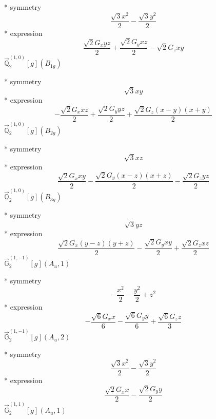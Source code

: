 \documentclass[fleqn,8pt]{jsarticle}
\begin{document}
\noindent\quad ** symmetry
\begin{dmath*}
\frac{\sqrt{3} x^{2}}{2} - \frac{\sqrt{3} y^{2}}{2}
\end{dmath*}
\noindent\quad ** expression
\begin{dmath*}
\frac{\sqrt{2} G_{x} y z}{2} + \frac{\sqrt{2} G_{y} x z}{2} - \sqrt{2} G_{z} x y
\end{dmath*}
\noindent\quad $\vec{\mathbb{Q}}_{2}^{(1,0)}[g](B_{1g})$

\noindent\quad ** symmetry
\begin{dmath*}
\sqrt{3} x y
\end{dmath*}
\noindent\quad ** expression
\begin{dmath*}
- \frac{\sqrt{2} G_{x} x z}{2} + \frac{\sqrt{2} G_{y} y z}{2} + \frac{\sqrt{2} G_{z} \left(x - y\right) \left(x + y\right)}{2}
\end{dmath*}
\noindent\quad $\vec{\mathbb{Q}}_{2}^{(1,0)}[g](B_{2g})$

\noindent\quad ** symmetry
\begin{dmath*}
\sqrt{3} x z
\end{dmath*}
\noindent\quad ** expression
\begin{dmath*}
\frac{\sqrt{2} G_{x} x y}{2} - \frac{\sqrt{2} G_{y} \left(x - z\right) \left(x + z\right)}{2} - \frac{\sqrt{2} G_{z} y z}{2}
\end{dmath*}
\noindent\quad $\vec{\mathbb{Q}}_{2}^{(1,0)}[g](B_{3g})$

\noindent\quad ** symmetry
\begin{dmath*}
\sqrt{3} y z
\end{dmath*}
\noindent\quad ** expression
\begin{dmath*}
\frac{\sqrt{2} G_{x} \left(y - z\right) \left(y + z\right)}{2} - \frac{\sqrt{2} G_{y} x y}{2} + \frac{\sqrt{2} G_{z} x z}{2}
\end{dmath*}
\noindent\quad $\vec{\mathbb{G}}_{2}^{(1,-1)}[g](A_{u},1)$

\noindent\quad ** symmetry
\begin{dmath*}
- \frac{x^{2}}{2} - \frac{y^{2}}{2} + z^{2}
\end{dmath*}
\noindent\quad ** expression
\begin{dmath*}
- \frac{\sqrt{6} G_{x} x}{6} - \frac{\sqrt{6} G_{y} y}{6} + \frac{\sqrt{6} G_{z} z}{3}
\end{dmath*}
\noindent\quad $\vec{\mathbb{G}}_{2}^{(1,-1)}[g](A_{u},2)$

\noindent\quad ** symmetry
\begin{dmath*}
\frac{\sqrt{3} x^{2}}{2} - \frac{\sqrt{3} y^{2}}{2}
\end{dmath*}
\noindent\quad ** expression
\begin{dmath*}
\frac{\sqrt{2} G_{x} x}{2} - \frac{\sqrt{2} G_{y} y}{2}
\end{dmath*}
\noindent\quad $\vec{\mathbb{G}}_{2}^{(1,1)}[g](A_{u},1)$
\end{document}
